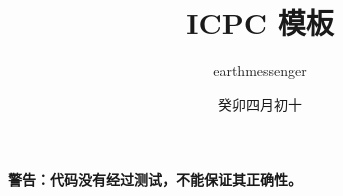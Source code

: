 \documentclass{article}
\title{ICPC 模板}
\author{earthmessenger}
\date{癸卯四月初十}
\begin{document}
\maketitle

\clearpage

\textbf{警告：代码没有经过测试，不能保证其正确性。}

\tableofcontents







\end{document}
